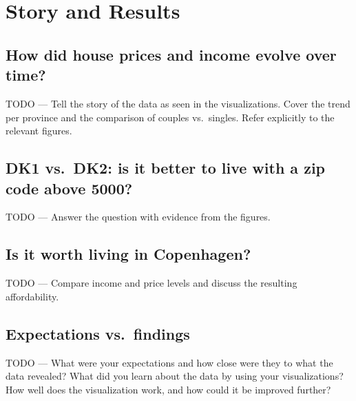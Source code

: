 \section{Story and Results}
\label{sec:story}

\subsection{How did house prices and income evolve over time?}

TODO --- Tell the story of the data as seen in the visualizations. Cover
the trend per province and the comparison of couples vs.\ singles. Refer
explicitly to the relevant figures.

\subsection{DK1 vs.\ DK2: is it better to live with a zip code above 5000?}

TODO --- Answer the question with evidence from the figures.

\subsection{Is it worth living in Copenhagen?}

TODO --- Compare income and price levels and discuss the resulting
affordability.

\subsection{Expectations vs.\ findings}

TODO --- What were your expectations and how close were they to what the
data revealed? What did you learn about the data by using your
visualizations? How well does the visualization work, and how could it be
improved further?
